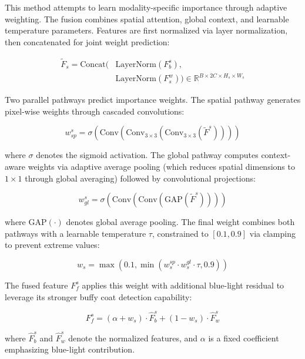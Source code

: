 This method attempts to learn modality-specific importance through adaptive weighting. The fusion combines spatial attention, global context, and learnable temperature parameters. Features are first normalized via layer normalization, then concatenated for joint weight prediction:

\begin{equation}
\begin{split}
\tilde{F}_s = \text{Concat}(&\text{LayerNorm}(F_b^s), \\
&\text{LayerNorm}(F^w_s)) \in \mathbb{R}^{B \times 2C \times H_s \times W_s}
\end{split}
\end{equation}

Two parallel pathways predict importance weights. The spatial pathway generates pixel-wise weights through cascaded convolutions:

\begin{equation}
w^s_{sp} = \sigma(\text{Conv}(\text{Conv}_{3\times3}(\text{Conv}_{3\times3}(\tilde{F}^s))))
\end{equation}

where $\sigma$ denotes the sigmoid activation. The global pathway computes context-aware weights via adaptive average pooling (which reduces spatial dimensions to $1 \times 1$ through global averaging) followed by convolutional projections:

\begin{equation}
w^s_{gl} = \sigma(\text{Conv}(\text{Conv}(\text{GAP}(\tilde{F}^s))))
\end{equation}

where $\text{GAP}(\cdot)$ denotes global average pooling. The final weight combines both pathways with a learnable temperature $\tau$, constrained to $[0.1, 0.9]$ via clamping to prevent extreme values:

\begin{equation}
w_s = \max(0.1, \min(w_s^{sp} \cdot w_s^{gl} \cdot \tau, 0.9))
\end{equation}

The fused feature $F_{f}^s$ applies this weight with additional blue-light residual to leverage its stronger buffy coat detection capability:

\begin{equation}
F_{f}^s = (\alpha + w_s) \cdot \hat{F}_b^s + (1 - w_s) \cdot \hat{F}_w^s
\end{equation}

where $\hat{F}_b^s$ and $\hat{F}_w^s$ denote the normalized features, and $\alpha$ is a fixed coefficient emphasizing blue-light contribution.

